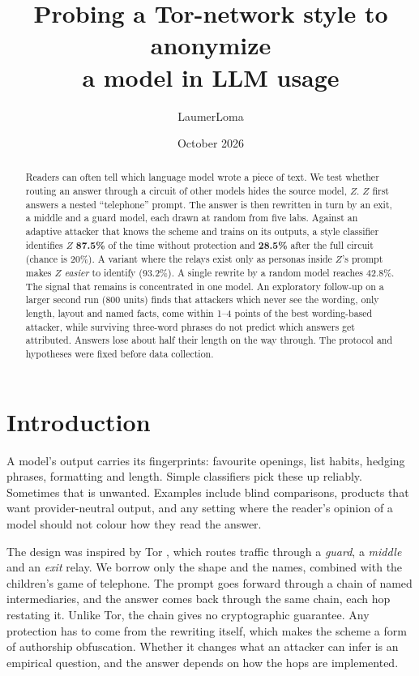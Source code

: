 \documentclass[11pt]{article}
\title{\textbf{Probing a Tor-network style to anonymize\\a model in LLM usage}}
\author{LaumerLoma}
\date{October 2026}
\begin{document}
\maketitle

\begin{abstract}
\noindent
Readers can often tell which language model wrote a piece of text. We test whether routing an answer through a circuit of other models hides the source model, $Z$. $Z$ first answers a nested ``telephone'' prompt. The answer is then rewritten in turn by an exit, a middle and a guard model, each drawn at random from five labs. Against an adaptive attacker that knows the scheme and trains on its outputs, a style classifier identifies $Z$ \textbf{87.5\%} of the time without protection and \textbf{28.5\%} after the full circuit (chance is 20\%). A variant where the relays exist only as personas inside $Z$'s prompt makes $Z$ \emph{easier} to identify (93.2\%). A single rewrite by a random model reaches 42.8\%. The signal that remains is concentrated in one model. An exploratory follow-up on a larger second run (800 units) finds that attackers which never see the wording, only length, layout and named facts, come within 1--4 points of the best wording-based attacker, while surviving three-word phrases do not predict which answers get attributed. Answers lose about half their length on the way through. The protocol and hypotheses were fixed before data collection.
\end{abstract}

\section{Introduction}

A model's output carries its fingerprints: favourite openings, list habits, hedging phrases, formatting and length. Simple classifiers pick these up reliably. Sometimes that is unwanted. Examples include blind comparisons, products that want provider-neutral output, and any setting where the reader's opinion of a model should not colour how they read the answer.

The design was inspired by Tor \cite{tor}, which routes traffic through a \emph{guard}, a \emph{middle} and an \emph{exit} relay. We borrow only the shape and the names, combined with the children's game of telephone. The prompt goes forward through a chain of named intermediaries, and the answer comes back through the same chain, each hop restating it. Unlike Tor, the chain gives no cryptographic guarantee. Any protection has to come from the rewriting itself, which makes the scheme a form of authorship obfuscation. Whether it changes what an attacker can infer is an empirical question, and the answer depends on how the hops are implemented.
\end{document}
